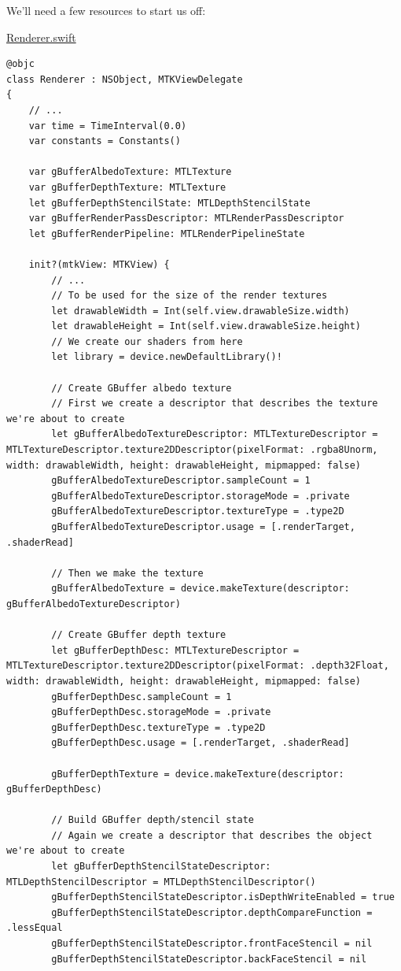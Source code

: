 \documentclass[11pt]{article}
\begin{document}
We'll need a few resources to start us off:

\uline{Renderer.swift}
\begin{verbatim}
@objc
class Renderer : NSObject, MTKViewDelegate
{
    // ...
    var time = TimeInterval(0.0)
    var constants = Constants()

    var gBufferAlbedoTexture: MTLTexture
    var gBufferDepthTexture: MTLTexture
    let gBufferDepthStencilState: MTLDepthStencilState
    var gBufferRenderPassDescriptor: MTLRenderPassDescriptor
    let gBufferRenderPipeline: MTLRenderPipelineState

    init?(mtkView: MTKView) {
        // ...
        // To be used for the size of the render textures
        let drawableWidth = Int(self.view.drawableSize.width)
        let drawableHeight = Int(self.view.drawableSize.height)
        // We create our shaders from here
        let library = device.newDefaultLibrary()!

        // Create GBuffer albedo texture
        // First we create a descriptor that describes the texture we're about to create
        let gBufferAlbedoTextureDescriptor: MTLTextureDescriptor = MTLTextureDescriptor.texture2DDescriptor(pixelFormat: .rgba8Unorm, width: drawableWidth, height: drawableHeight, mipmapped: false)
        gBufferAlbedoTextureDescriptor.sampleCount = 1
        gBufferAlbedoTextureDescriptor.storageMode = .private
        gBufferAlbedoTextureDescriptor.textureType = .type2D
        gBufferAlbedoTextureDescriptor.usage = [.renderTarget, .shaderRead]

        // Then we make the texture
        gBufferAlbedoTexture = device.makeTexture(descriptor: gBufferAlbedoTextureDescriptor)

        // Create GBuffer depth texture
        let gBufferDepthDesc: MTLTextureDescriptor = MTLTextureDescriptor.texture2DDescriptor(pixelFormat: .depth32Float, width: drawableWidth, height: drawableHeight, mipmapped: false)
        gBufferDepthDesc.sampleCount = 1
        gBufferDepthDesc.storageMode = .private
        gBufferDepthDesc.textureType = .type2D
        gBufferDepthDesc.usage = [.renderTarget, .shaderRead]

        gBufferDepthTexture = device.makeTexture(descriptor: gBufferDepthDesc)

        // Build GBuffer depth/stencil state
        // Again we create a descriptor that describes the object we're about to create
        let gBufferDepthStencilStateDescriptor: MTLDepthStencilDescriptor = MTLDepthStencilDescriptor()
        gBufferDepthStencilStateDescriptor.isDepthWriteEnabled = true
        gBufferDepthStencilStateDescriptor.depthCompareFunction = .lessEqual
        gBufferDepthStencilStateDescriptor.frontFaceStencil = nil
        gBufferDepthStencilStateDescriptor.backFaceStencil = nil


\end{verbatim}
\end{document}
